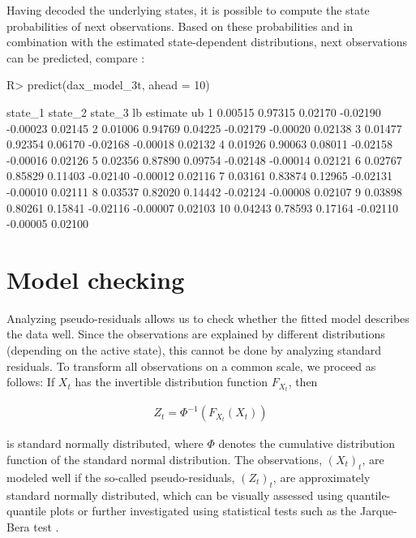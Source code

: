 \documentclass[article]{jss}
\begin{document}
Having decoded the underlying states, it is possible to compute the state probabilities of next observations. Based on these probabilities and in combination with the estimated state-dependent distributions, next observations can be predicted, compare \cite{zuc16}:

%
\begin{Schunk}
\begin{Sinput}
R> predict(dax_model_3t, ahead = 10)
\end{Sinput}
\begin{Soutput}
   state_1 state_2 state_3       lb estimate      ub
1  0.00515 0.97315 0.02170 -0.02190 -0.00023 0.02145
2  0.01006 0.94769 0.04225 -0.02179 -0.00020 0.02138
3  0.01477 0.92354 0.06170 -0.02168 -0.00018 0.02132
4  0.01926 0.90063 0.08011 -0.02158 -0.00016 0.02126
5  0.02356 0.87890 0.09754 -0.02148 -0.00014 0.02121
6  0.02767 0.85829 0.11403 -0.02140 -0.00012 0.02116
7  0.03161 0.83874 0.12965 -0.02131 -0.00010 0.02111
8  0.03537 0.82020 0.14442 -0.02124 -0.00008 0.02107
9  0.03898 0.80261 0.15841 -0.02116 -0.00007 0.02103
10 0.04243 0.78593 0.17164 -0.02110 -0.00005 0.02100
\end{Soutput}
\end{Schunk}
%

\section{Model checking} \label{sec:model_checking} %

Analyzing pseudo-residuals allows us to check whether the fitted model describes the data well. Since the observations are explained by different distributions (depending on the active state), this cannot be done by analyzing standard residuals. To transform all observations on a common scale, we proceed as follows: If $X_t$ has the invertible distribution function $F_{X_t}$, then

\begin{align*}
Z_t=\Phi^{-1}(F_{X_t} (X_t))
\end{align*}

is standard normally distributed, where $\Phi$ denotes the cumulative distribution function of the standard normal distribution. The observations, $(X_t)_t$, are modeled well if the so-called pseudo-residuals, $(Z_t)_t$, are approximately standard normally distributed, which can be visually assessed using quantile-quantile plots or further investigated using statistical tests such as the Jarque-Bera test \cite{zuc16}. 
\end{document}
